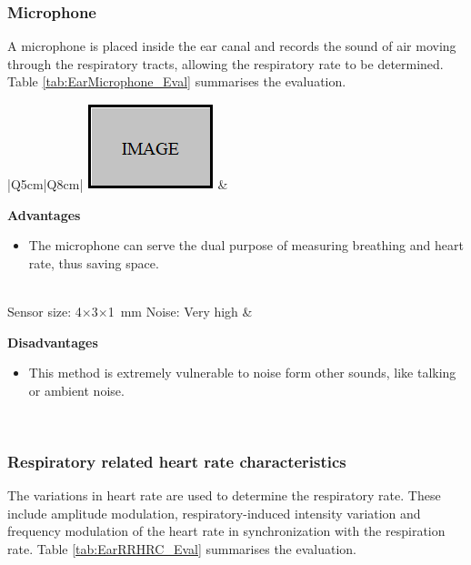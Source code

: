 \subsubsection{Microphone}
A microphone is placed inside the ear canal and records the sound of air moving through the respiratory tracts, allowing the respiratory rate to be determined. Table \ref{tab:EarMicrophone_Eval} summarises the evaluation.

\begin{table}[H]
\caption{Ear Microphone}
\label{tab:EarMicrophone_Eval}
\renewcommand{\arraystretch}{1.3}	%
\centering
\begin{tabular}{|Q{5cm}|Q{8cm}|} 
 \hline
 \includegraphics[scale=0.8]{figs/Image.png} 		& 	
 
	\textbf{Advantages}
	\begin{itemize}[leftmargin=1em, noitemsep, topsep=2pt]	  
	\item The microphone can serve the dual purpose of measuring breathing and heart rate, thus saving space.
	\end{itemize}\\ 

\hline
Sensor size: 4$\times$3$\times$\SI{1}{\milli\meter} \citep{Microphone}		\newline
Noise: Very high	&

	\textbf{Disadvantages}
	\begin{itemize}[leftmargin=1em, noitemsep, topsep=2pt]	  
	\item This method is extremely vulnerable to noise form other sounds, like talking or ambient noise.
	\end{itemize}\\ 
	
 \hline
\end{tabular}
\end{table}

\subsubsection{Respiratory related heart rate characteristics}
The variations in heart rate are used to determine the respiratory rate. These include amplitude modulation, respiratory-induced intensity variation and frequency modulation of the heart rate in synchronization with the respiration rate. Table \ref{tab:EarRRHRC_Eval} summarises the evaluation.

